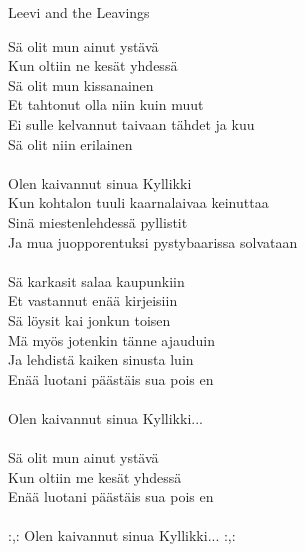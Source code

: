  {Leevi and the Leavings}

Sä olit mun ainut ystävä \\
Kun oltiin ne kesät yhdessä \\
Sä olit mun kissanainen \\
Et tahtonut olla niin kuin muut \\
Ei sulle kelvannut taivaan tähdet ja kuu \\
Sä olit niin erilainen \\

\hspace{10mm} \\

Olen kaivannut sinua Kyllikki \\
Kun kohtalon tuuli kaarnalaivaa keinuttaa \\
Sinä miestenlehdessä pyllistit \\
Ja mua juopporentuksi pystybaarissa solvataan \\

\hspace{10mm} \\

Sä karkasit salaa kaupunkiin \\
Et vastannut enää kirjeisiin \\
Sä löysit kai jonkun toisen \\
Mä myös jotenkin tänne ajauduin \\
Ja lehdistä kaiken sinusta luin \\
Enää luotani päästäis sua pois en \\

\hspace{10mm} \\

Olen kaivannut sinua Kyllikki... \\

\hspace{10mm} \\

Sä olit mun ainut ystävä \\
Kun oltiin me kesät yhdessä \\
Enää luotani päästäis sua pois en \\

\hspace{10mm} \\

:,: Olen kaivannut sinua Kyllikki... :,: \\